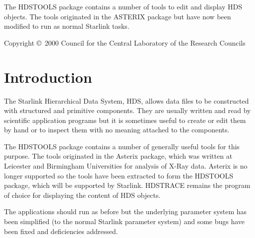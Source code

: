 \documentclass[twoside,11pt]{article}
\newcommand{\stardocinitials}  {SUN}
\newcommand{\stardoccopyright} 
{Copyright \copyright\ 2000 Council for the Central Laboratory of the Research Councils}
\newcommand{\stardocnumber}    {245.0}
\newcommand{\stardocabstract}  {The HDSTOOLS package contains a number of tools
to edit and display HDS objects. The tools originated in the ASTERIX package
but have now been modified to run as normal Starlink tasks.}
\newcommand{\stardocname}{\stardocinitials /\stardocnumber}
\newenvironment{latexonly}{}{}
\newcommand{\xref}[3]{#1}
\renewcommand{\_}{\texttt{\symbol{95}}}
\renewcommand{\thepage}{\roman{page}}
\begin{document}
\stardocabstract

\begin{latexonly}
\newpage
\vspace*{\fill}
\stardoccopyright
\end{latexonly}

  \newpage
  \begin{latexonly}
    \setlength{\parskip}{0mm}
    \tableofcontents
    \setlength{\parskip}{\medskipamount}
    \markboth{\stardocname}{\stardocname}
  \end{latexonly}

\cleardoublepage
\renewcommand{\thepage}{\arabic{page}}
\setcounter{page}{1}

\section{Introduction}
The Starlink Hierarchical Data System,
\xref{HDS}{sun92}{},
allows data files to be constructed with structured and primitive components.
They are usually written and read by scientific application programs but it is
sometimes useful to create or edit them by hand or to inspect them with no
meaning attached to the components.

The HDSTOOLS package contains a number of generally useful tools for this
purpose. The tools originated in the Asterix package, which was written at
Leicester and Birmingham Universities for analysis of X-Ray data.
Asterix is no longer supported so the tools have been extracted to form the
HDSTOOLS package, which will be supported by Starlink.
\xref{HDSTRACE}{sun102}{} remains the program of choice for displaying the
content of HDS objects.

The applications should run as before but the underlying parameter system has
been simplified (to the normal Starlink parameter system) and some bugs have 
been fixed and deficiencies addressed.
\end{document}
